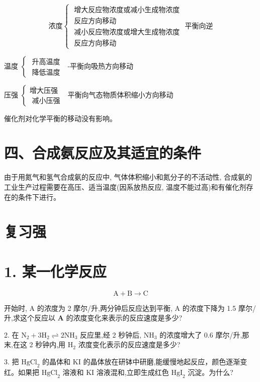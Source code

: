 \documentclass[10pt]{article}
\begin{document}
\[
\text{浓度}\left\{ \begin{array}{l} \text{ 增大反应物浓度或减小生成物浓度 } \\ \text{ 反应方向移动 } \\ \text{ 减小反应物浓度或增大生成物浓度 } \\ \text{ 反应方向移动 } \end{array}\right. \text{平衡向逆}
\]

温度 \(\left\{ \begin{array}{l} \text{ 升高温度 } \\ \text{ 降低温度 } \end{array}\right.\) -平衡向吸热方向移动

压强 \(\left\{ \begin{array}{l} \text{增大压强 } \\ \text{ 减小压强 } \end{array}\right.\) 平衡向气态物质体积缩小方向移动

催化剂对化学平衡的移动没有影响。

\section*{四、合成氨反应及其适宜的条件}

由于用氮气和氢气合成氨的反应中, 气体体积缩小和氮分子的不活动性, 合成氨的工业生产过程需要在高压、适当温度(因系放热反应, 温度不能过高)和有催化剂存在的条件下进行。

\section*{复习强}

\section*{1. 某一化学反应}

\[
\mathrm{A} + \mathrm{B} \rightarrow \mathrm{C}
\]

开始时, \(\mathrm{A}\) 的浓度为 2 摩尔/升,两分钟后反应达到平衡, \(\mathrm{A}\) 的浓度下降为 1.5 摩尔/升,求这个反应以 \(\mathbf{A}\) 的浓度变化来表示的反应速度是多少?

2. 在 \({\mathrm{N}}_{2} + 3{\mathrm{H}}_{2} \rightleftharpoons 2{\mathrm{{NH}}}_{3}\) 反应里,经 2 秒钟后, \({\mathrm{{NH}}}_{3}\) 的浓度增大了 0.6 摩尔/升,那末,在这 2 秒钟内,用 \({\mathrm{H}}_{2}\) 浓度变化表示的反应速度是多少?

3. 把 \({\mathrm{{HgCl}}}_{2}\) 的晶体和 \(\mathrm{{KI}}\) 的晶体放在研钵中研磨,能缓慢地起反应，颜色逐渐变红。如果把 \({\mathrm{{HgCl}}}_{2}\) 溶液和 \(\mathrm{{KI}}\) 溶液混和,立即生成红色 \({\mathrm{{HgI}}}_{2}\) 沉淀。为什么?
\end{document}
